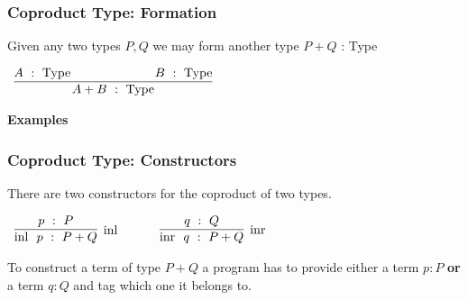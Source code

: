 \documentclass{beamer}
\theoremstyle{indentDefn} \newtheorem{defn}[]{Definition}
\begin{document}
\begin{frame}
  \frametitle{Coproduct Type: Formation}

  Given any two types $P,Q$ we may form another type $P + Q$ : Type
     \begin{center}
  	$\begin{array}{c}
  		\infer[]{A + B  \ : \ \text{Type}}
  			{A  \ : \ \text{Type}
  			\hspace{10mm}&\hspace{10mm}
  			 B  \ : \ \text{Type}}
  	\end{array}$  
  \end{center}

	\textbf{Examples}

\vspace{50mm}
  
  \end{frame}
  
  \begin{frame}
  \frametitle{Coproduct Type: Constructors}
  
  There are two constructors for the coproduct of two types.

  \begin{center}
    $\begin{array}{c c c}
      \infer[\text{\inl}]{\inl \ p \ : \ P + Q}{p \ : \ P}

      &
      \quad
      &

      \infer[\text{\inr}]{\inr \ q \ : \ P + Q}{q \ : \ Q}

    \end{array}$
  \end{center}

  To construct a term of type $P + Q$ a program has to provide either a term $p : P$ {\bf or} a term $q : Q$ and tag which one it belongs to. 



	\vspace{50mm}

\end{frame}
\end{document}

